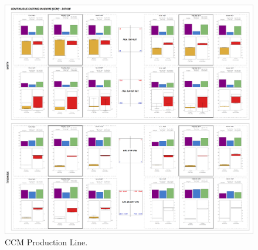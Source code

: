 \begin{landscape}
\begin{figure}[ht]
	\centering
	\includegraphics[width=1.1\textwidth]{../images/supplements-CCM_real_life_events_analysis-results.png}
	\caption{CCM Production Line.}
	\label{figure-supplements-CCM}
\end{figure}
\end{landscape}